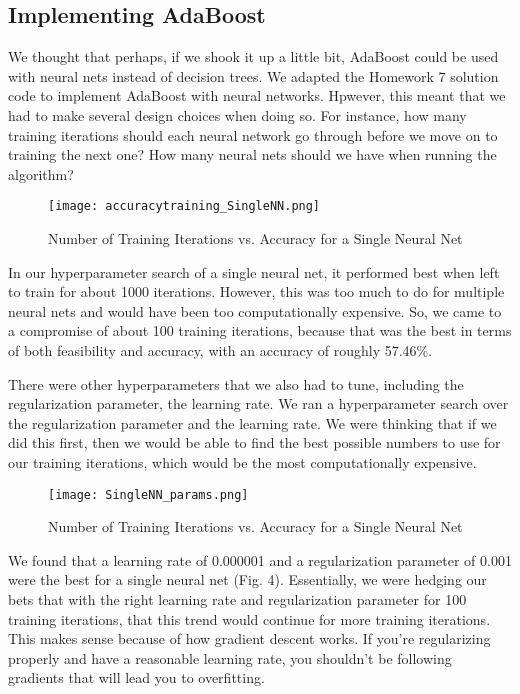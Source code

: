 \documentclass[conference]{IEEEtran}
\begin{document}
\subsection{Implementing AdaBoost}

We thought that perhaps, if we shook it up a little bit, AdaBoost could be used with neural nets instead of decision trees. We adapted the Homework 7 solution code to implement AdaBoost with neural networks. Hpwever, this meant that we had to make several design choices when doing so. For instance, how many training iterations should each neural network go through before we move on to training the next one? How many neural nets should we have when running the algorithm?\newline


\begin{figure}[h]
\centerline{\texttt{[image: accuracytraining\_SingleNN.png]}}
\caption{Number of Training Iterations vs. Accuracy for a Single Neural Net}
\label{fig}
\end{figure}

In our hyperparameter search of a single neural net, it performed best when left to train for about 1000 iterations. However, this was too much to do for multiple neural nets and would have been too computationally expensive. So, we came to a compromise of about 100 training iterations, because that was the best in terms of both feasibility and accuracy, with an accuracy of roughly 57.46\%. \newline

There were other hyperparameters that we also had to tune, including the regularization parameter, the learning rate. We ran a hyperparameter search over the regularization parameter and the learning rate. We were thinking that if we did this first, then we would be able to find the best possible numbers to use for our training iterations, which would be the most computationally expensive. 
\begin{figure}[h]
\centerline{\texttt{[image: SingleNN\_params.png]}}
\caption{Number of Training Iterations vs. Accuracy for a Single Neural Net}
\label{fig}
\end{figure} 

We found that a learning rate of 0.000001 and a regularization parameter of 0.001 were the best for a single neural net (Fig. 4). Essentially, we were hedging our bets that with the right learning rate and regularization parameter for 100 training iterations, that this trend would continue for more training iterations. This makes sense because of how gradient descent works. If you’re regularizing properly and have a reasonable learning rate, you shouldn’t be following gradients that will lead you to overfitting. \newline
\end{document}
